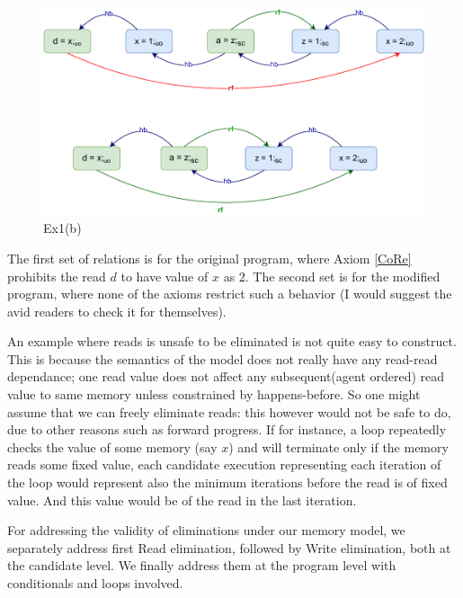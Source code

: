     \begin{figure}[H]
        \centering
        \includegraphics[scale=0.7]{6.Elimination/EliminationExample1(b).pdf}
        \caption{Ex1(b)} 
    \end{figure}


    The first set of relations is for the original program, where Axiom \ref{CoRe} prohibits the read $d$ to have value of $x$ as $2$.
    The second set is for the modified program, where none of the axioms restrict such a behavior (I would suggest the avid readers to check it for themselves).
    
    An example where reads is unsafe to be eliminated is not quite easy to construct.
    This is because the semantics of the model does not really have any read-read dependance; one read value does not affect any subsequent(agent ordered) read value to same memory unless constrained by happens-before.
    So one might assume that we can freely eliminate reads: this however would not be safe to do, due to other reasons such as forward progress.
    If for instance, a loop repeatedly checks the value of some memory (say $x$) and will terminate only if the memory reads some fixed value, each candidate execution representing each iteration of the loop would represent also the minimum iterations before the read is of fixed value. 
    And this value would be of the read in the last iteration. 

    For addressing the validity of eliminations under our memory model, we separately address first Read elimination, followed by Write elimination, both at the candidate level. 
    We finally address them at the program level with conditionals and loops involved. 
